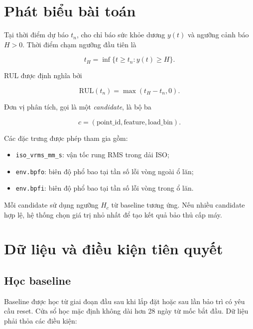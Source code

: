 \documentclass[12pt,a4paper]{article}
\newcommand{\RUL}{\mathrm{RUL}}
\newcommand{\code}[1]{\texttt{#1}}
\begin{document}
\section{Phát biểu bài toán}

Tại thời điểm dự báo $t_n$, cho chỉ báo sức khỏe dương $y(t)$ và ngưỡng cảnh báo $H>0$. Thời điểm chạm ngưỡng đầu tiên là

\begin{equation}
  t_H=\inf\{t\ge t_n:y(t)\ge H\}.
\end{equation}

RUL được định nghĩa bởi

\begin{equation}
  \RUL(t_n)=\max(t_H-t_n,0).
  \label{eq:rul-definition}
\end{equation}

Đơn vị phân tích, gọi là một \emph{candidate}, là bộ ba

\begin{equation}
  c=(\text{point\_id},\text{feature},\text{load\_bin}).
\end{equation}

Các đặc trưng được phép tham gia gồm:

\begin{itemize}
  \item \code{iso\_vrms\_mm\_s}: vận tốc rung RMS trong dải ISO;
  \item \code{env.bpfo}: biên độ phổ bao tại tần số lỗi vòng ngoài ổ lăn;
  \item \code{env.bpfi}: biên độ phổ bao tại tần số lỗi vòng trong ổ lăn.
\end{itemize}

Mỗi candidate sử dụng ngưỡng $H_c$ từ baseline tương ứng. Nếu nhiều candidate hợp lệ, hệ thống chọn giá trị nhỏ nhất để tạo kết quả bảo thủ cấp máy.

\section{Dữ liệu và điều kiện tiên quyết}

\subsection{Học baseline}

Baseline được học từ giai đoạn đầu sau khi lắp đặt hoặc sau lần bảo trì có yêu cầu reset. Cửa sổ học mặc định không dài hơn 28 ngày từ mốc bắt đầu. Dữ liệu phải thỏa các điều kiện:
\end{document}
